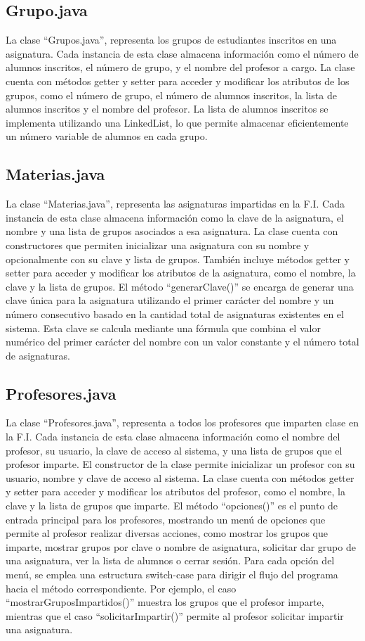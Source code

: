 \documentclass[a4paper,12pt]{article}
\begin{document}
\subsection{Grupo.java}
La clase “Grupos.java”, representa los grupos de estudiantes inscritos en una asignatura. 
Cada instancia de esta clase almacena información como el número de alumnos inscritos, el 
número de grupo, y el nombre del profesor a cargo.
La clase cuenta con métodos getter y setter para acceder y modificar los atributos de los 
grupos, como el número de grupo, el número de alumnos inscritos, la lista de alumnos 
inscritos y el nombre del profesor.
La lista de alumnos inscritos se implementa utilizando una LinkedList, lo que permite 
almacenar eficientemente un número variable de alumnos en cada grupo.

\subsection{Materias.java}
La clase “Materias.java”, representa las asignaturas impartidas en la F.I. Cada instancia de 
esta clase almacena información como la clave de la asignatura, el nombre y una lista de 
grupos asociados a esa asignatura.
La clase cuenta con constructores que permiten inicializar una asignatura con su nombre y 
opcionalmente con su clave y lista de grupos. También incluye métodos getter y setter para 
acceder y modificar los atributos de la asignatura, como el nombre, la clave y la lista de 
grupos.
El método “generarClave()” se encarga de generar una clave única para la asignatura 
utilizando el primer carácter del nombre y un número consecutivo basado en la cantidad total 
de asignaturas existentes en el sistema. Esta clave se calcula mediante una fórmula que 
combina el valor numérico del primer carácter del nombre con un valor constante y el 
número total de asignaturas.

\subsection{Profesores.java}
La clase “Profesores.java”, representa a todos los profesores que imparten clase en la F.I. 
Cada instancia de esta clase almacena información como el nombre del profesor, su usuario, 
la clave de acceso al sistema, y una lista de grupos que el profesor imparte.
El constructor de la clase permite inicializar un profesor con su usuario, nombre y clave de 
acceso al sistema.
La clase cuenta con métodos getter y setter para acceder y modificar los atributos del 
profesor, como el nombre, la clave y la lista de grupos que imparte.
El método “opciones()” es el punto de entrada principal para los profesores, mostrando un 
menú de opciones que permite al profesor realizar diversas acciones, como mostrar los 
grupos que imparte, mostrar grupos por clave o nombre de asignatura, solicitar dar grupo de 
una asignatura, ver la lista de alumnos o cerrar sesión.
Para cada opción del menú, se emplea una estructura switch-case para dirigir el flujo del 
programa hacia el método correspondiente. Por ejemplo, el caso 
“mostrarGruposImpartidos()” muestra los grupos que el profesor imparte, mientras que el 
caso “solicitarImpartir()” permite al profesor solicitar impartir una asignatura.
\end{document}
